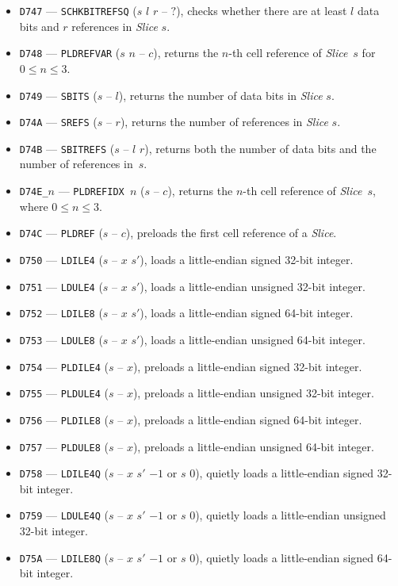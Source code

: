 \documentclass[12pt,oneside]{article}
\begin{document}
\begin{itemize}
\item {\tt D747} --- {\tt SCHKBITREFSQ} ($s$ $l$ $r$ -- $?$), checks whether there are at least $l$ data bits and $r$ references in {\em Slice\/} $s$.
\item {\tt D748} --- {\tt PLDREFVAR} ($s$ $n$ -- $c$), returns the $n$-th cell reference of {\em Slice\/}~$s$ for $0\leq n\leq 3$.
\item {\tt D749} --- {\tt SBITS} ($s$ -- $l$), returns the number of data bits in {\em Slice\/} $s$.
\item {\tt D74A} --- {\tt SREFS} ($s$ -- $r$), returns the number of references in {\em Slice\/} $s$.
\item {\tt D74B} --- {\tt SBITREFS} ($s$ -- $l$ $r$), returns both the number of data bits and the number of references in~$s$.
\item {\tt D74E\_$n$} --- {\tt PLDREFIDX $n$} ($s$ -- $c$), returns the $n$-th cell reference of {\em Slice\/}~$s$, where $0\leq n\leq 3$.
\item {\tt D74C} --- {\tt PLDREF} ($s$ -- $c$), preloads the first cell reference of a {\em Slice}.
\item {\tt D750} --- {\tt LDILE4} ($s$ -- $x$ $s'$), loads a little-endian signed 32-bit integer. 
\item {\tt D751} --- {\tt LDULE4} ($s$ -- $x$ $s'$), loads a little-endian unsigned 32-bit integer. 
\item {\tt D752} --- {\tt LDILE8} ($s$ -- $x$ $s'$), loads a little-endian signed 64-bit integer. 
\item {\tt D753} --- {\tt LDULE8} ($s$ -- $x$ $s'$), loads a little-endian unsigned 64-bit integer. 
\item {\tt D754} --- {\tt PLDILE4} ($s$ -- $x$), preloads a little-endian signed 32-bit integer. 
\item {\tt D755} --- {\tt PLDULE4} ($s$ -- $x$), preloads a little-endian unsigned 32-bit integer. 
\item {\tt D756} --- {\tt PLDILE8} ($s$ -- $x$), preloads a little-endian signed 64-bit integer. 
\item {\tt D757} --- {\tt PLDULE8} ($s$ -- $x$), preloads a little-endian unsigned 64-bit integer. 
\item {\tt D758} --- {\tt LDILE4Q} ($s$ -- $x$ $s'$ $-1$ or $s$ $0$), quietly loads a little-endian signed 32-bit integer. 
\item {\tt D759} --- {\tt LDULE4Q} ($s$ -- $x$ $s'$ $-1$ or $s$ $0$), quietly loads a little-endian unsigned 32-bit integer. 
\item {\tt D75A} --- {\tt LDILE8Q} ($s$ -- $x$ $s'$ $-1$ or $s$ $0$), quietly loads a little-endian signed 64-bit integer. 

\end{itemize}
\end{document}

